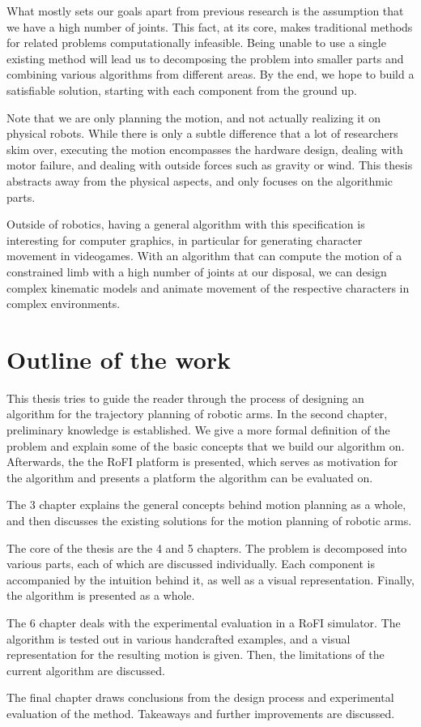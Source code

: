What mostly sets our goals apart from previous research is the assumption that we have a high number of joints. This fact, at its core, makes traditional methods for related problems computationally infeasible.
Being unable to use a single existing method will lead us to decomposing the problem into smaller parts and combining various algorithms from different areas. By the end, we hope to build a satisfiable solution, starting with each component from the ground up.

Note that we are only planning the motion, and not actually realizing it on physical robots. While there is only a subtle difference that a lot of researchers skim over, executing the motion encompasses the hardware design, dealing with motor failure, and dealing with outside forces such as gravity or wind. This thesis abstracts away from the physical aspects, and only focuses on the algorithmic parts.

Outside of robotics, having a general algorithm with this specification is interesting for computer graphics, in particular for generating character movement in videogames.
With an algorithm that can compute the motion of a constrained limb with a high number of joints at our disposal, we can design complex kinematic models and animate movement of the respective characters in complex environments.

\section{Outline of the work}

This thesis tries to guide the reader through the process of designing an algorithm for the trajectory planning of robotic arms. In the second chapter, preliminary knowledge is established. We give a more formal definition of the problem and explain some of the basic concepts that we build our algorithm on. Afterwards, the the RoFI platform is presented, which serves as motivation for the algorithm and presents a platform the algorithm can be evaluated on.

The 3\rd{} chapter explains the general concepts behind motion planning as a whole, and then discusses the existing solutions for the motion planning of robotic arms.

The core of the thesis are the 4\th{} and 5\th{} chapters. The problem is decomposed into various parts, each of which are discussed individually. Each component is accompanied by the intuition behind it, as well as a visual representation. Finally, the algorithm is presented as a whole.

The 6\th{} chapter deals with the experimental evaluation in a RoFI simulator. The algorithm is tested out in various handcrafted examples, and a visual representation for the resulting motion is given. Then, the limitations of the current algorithm are discussed.

The final chapter draws conclusions from the design process and experimental evaluation of the method. Takeaways and further improvements are discussed.
